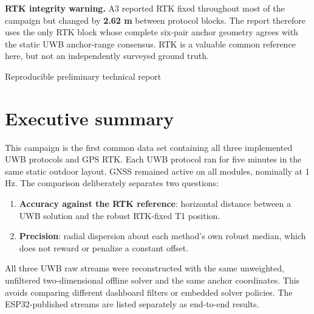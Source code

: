 \documentclass[11pt,a4paper]{article}
\begin{document}
\begin{titlepage}
  \vfill
  \colorbox{warning!10}{%
    \begin{minipage}{0.89\textwidth}
      \vspace{2mm}
      \textbf{RTK integrity warning.}
      A3 reported RTK fixed throughout most of the campaign but changed by
      \textbf{2.62 m} between protocol blocks. The report therefore uses the
      only RTK block whose complete six-pair anchor geometry agrees with the
      static UWB anchor-range consensus. RTK is a valuable common reference
      here, but not an independently surveyed ground truth.
      \vspace{2mm}
    \end{minipage}}
  \vspace{10mm}
  {\large Reproducible preliminary technical report\par}
\end{titlepage}

\tableofcontents
\clearpage
{}

\section{Executive summary}

This campaign is the first common data set containing all three implemented
UWB protocols and GPS RTK. Each UWB protocol ran for five minutes in the same
static outdoor layout. GNSS remained active on all modules, nominally at
1 Hz. The comparison deliberately separates two questions:

\begin{enumerate}[leftmargin=7mm]
  \item \textbf{Accuracy against the RTK reference}: horizontal distance
  between a UWB solution and the robust RTK-fixed T1 position.
  \item \textbf{Precision}: radial dispersion about each method's own robust
  median, which does not reward or penalize a constant offset.
\end{enumerate}

All three UWB raw streams were reconstructed with the same unweighted,
unfiltered two-dimensional offline solver and the same anchor coordinates.
This avoids comparing different dashboard filters or embedded solver policies.
The ESP32-published streams are listed separately as end-to-end results.
\end{document}
